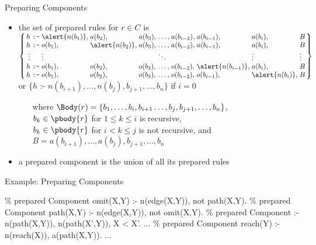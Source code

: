 \begin{frame}{Preparing Components}
  \vfill
  \begin{itemize}
    \item the set of \alert{prepared rules} for \(r \in C\) is\\
      \(\arraycolsep=1.4pt
        \left\{\begin{array}{rcllllllll}
          h & \texttt{:-} & \alert{n(b_1)}, & a(b_2),   & a(b_3), & \dots, & a(b_{i-2}), & a(b_{i-1}), & a(b_i), & B\\
          h & \texttt{:-} & o(b_1), & \alert{n(b_2)},   & a(b_3), & \dots, & a(b_{i-2}), & a(b_{i-1}), & a(b_i), & B\\
          \vdots &        & \vdots  &         &         & \ddots &             &             & \vdots  & \vdots \\
          h & \texttt{:-} & o(b_1), & o(b_2), & o(b_3), & \dots, & o(b_{i-2}), & \alert{n(b_{i-1})}, & a(b_i), & B\\
          h & \texttt{:-} & o(b_1), & o(b_2), & o(b_3), & \dots, & o(b_{i-2}), & o(b_{i-1}), & \alert{n(b_i)}, & B
        \end{array}\right\}\)\\
      or \(\{h \texttt{ :- } n(b_{i+1}), \dots, n(b_j), b_{j+1}, \dots, b_n\}\) if \(i=0\)
      \begin{itemize}
        \item[where]
          \(\Body(r) = \{ b_1, \dots, b_i, b_{i+1} \dots, b_j, b_{j+1}, \dots, b_n \}\), \\
          \(b_k\in\pbody{r}\) for \(1\leq k \leq i\) is recursive, \\
          \(b_k\in\pbody{r}\) for \(i< k \leq j\) is not recursive, and \\
          \(B = a(b_{i+1}), \dots, a(b_j), b_{j+1}, \dots, b_n\)
      \end{itemize}
    \item a \alert{prepared component} is the union of all its prepared rules
  \end{itemize}
\end{frame}

\begin{frame}[fragile]{Example: Preparing Components}
  \vfill
\begin{SemiVerbatim}{.9}
{\color{comment}\% prepared Component}
omit(X,Y) :- \alert{n(edge(X,Y))}, not path(X,Y).
{\color{comment}\% prepared Component}
path(X,Y) :- \alert{n(edge(X,Y))}, not omit(X,Y).
{\color{comment}\% prepared Component}
:- \alert{n(path(X,Y))}, \alert{n(path(X',Y))}, X < X'.
...
{\color{comment}\% prepared Component}
reach(Y) :- \alert{n(reach(X))}, \alert{a(path(X,Y))}.
...
\end{SemiVerbatim}
\end{frame}

